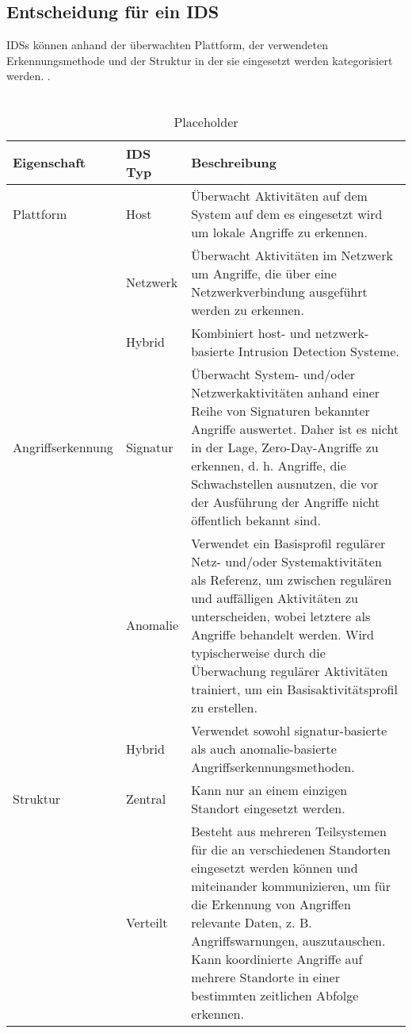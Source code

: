 \subsection{Entscheidung für ein IDS}
IDSs können anhand der überwachten Plattform, der verwendeten Erkennungsmethode und der Struktur in der sie eingesetzt werden kategorisiert werden. \cite{milenkoski_evaluating_2015}.\\\\
\begin{table}
\label{Tabelle_1}
\caption{Placeholder}
\begin{tabularx}{\columnwidth}{p{3cm} l p{10cm}}
\toprule
Eigenschaft 
& IDS Typ 
& Beschreibung\\
\midrule
Plattform   
& Host     
& Überwacht Aktivitäten auf dem System auf dem es eingesetzt wird um lokale Angriffe zu erkennen.\\\addlinespace[0.5em]
& Netzwerk 
& Überwacht Aktivitäten im Netzwerk um Angriffe, die über eine Netzwerkverbindung ausgeführt werden zu erkennen.\\ 
& Hybrid   
& Kombiniert host- und netzwerk-basierte Intrusion Detection Systeme.\\
\midrule
Angriffserkennung 
& Signatur        
& Überwacht System- und/oder Netzwerkaktivitäten anhand einer Reihe von Signaturen bekannter Angriffe auswertet. Daher ist es nicht in der Lage, Zero-Day-Angriffe zu erkennen, d. h. Angriffe, die Schwachstellen ausnutzen, die vor der Ausführung der Angriffe nicht öffentlich bekannt sind.\\\addlinespace[0.5em]
& Anomalie        
& Verwendet ein Basisprofil regulärer Netz- und/oder Systemaktivitäten als Referenz, um zwischen regulären und auffälligen Aktivitäten zu unterscheiden, wobei letztere als Angriffe behandelt werden. Wird typischerweise durch die Überwachung regulärer Aktivitäten trainiert, um ein Basisaktivitätsprofil zu erstellen.\\\addlinespace[0.5em]
& Hybrid          
& Verwendet sowohl signatur-basierte als auch anomalie-basierte Angriffserkennungsmethoden.\\ 
\midrule
Struktur
& Zentral
& Kann nur an einem einzigen Standort eingesetzt werden.\\\addlinespace[0.5em]
& Verteilt
& Besteht aus mehreren Teilsystemen für die an verschiedenen Standorten eingesetzt werden können und miteinander kommunizieren, um für die Erkennung von Angriffen relevante Daten, z. B. Angriffswarnungen, auszutauschen. Kann koordinierte Angriffe auf mehrere Standorte in einer bestimmten zeitlichen Abfolge erkennen.\\
\bottomrule
\end{tabularx}
\end{table}
